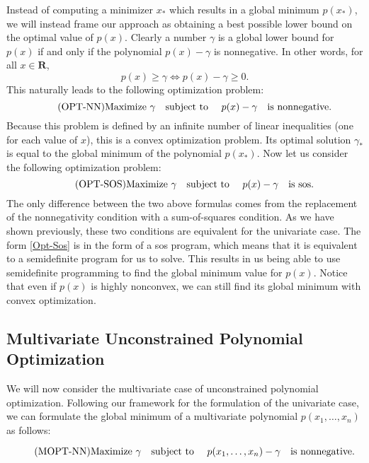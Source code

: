 	Instead of computing a minimizer $x_*$ which results in a global minimum $p(x_*)$, we will instead frame our approach as obtaining a best possible lower bound on the optimal value of $p(x)$. Clearly a number $\gamma$ is a global lower bound for $p(x)$ if and only if the polynomial $p(x) - \gamma$ is nonnegative. In other words, for all $x \in \mathbf{R}$,  
	$$
	p(x) \geq \gamma \iff p(x) - \gamma \geq 0.
	$$
	This naturally leads to the following optimization problem:
	\begin{equation} \label{Opt-Nn} \tag{OPT-NN}
		\textnormal{Maximize } \gamma \quad \textnormal{subject to } \quad p(x) - \gamma \quad \textnormal{is nonnegative}.
	\end{equation}
	Because this problem is defined by an infinite number of linear inequalities (one for each value of $x$), this is a convex optimization problem. Its optimal solution $\gamma_*$ is equal to the global minimum of the polynomial $p(x_*)$. Now let us consider the following optimization problem: 
	\begin{equation} \label{Opt-Sos} \tag{OPT-SOS}
	\textnormal{Maximize } \gamma \quad \textnormal{subject to } \quad p(x) - \gamma \quad \textnormal{is sos}.
	\end{equation}
	The only difference between the two above formulas comes from the replacement of the nonnegativity condition with a sum-of-squares condition. As we have shown previously, these two conditions are equivalent for the univariate case. The form \eqref{Opt-Sos} is in the form of a sos program, which means that it is equivalent to a semidefinite program for us to solve. This results in us being able to use semidefinite programming to find the global minimum value for $p(x)$. Notice that even if $p(x)$ is highly nonconvex, we can still find its global minimum with convex optimization. 
	
	\subsection{Multivariate Unconstrained Polynomial Optimization}
	
	We will now consider the multivariate case of unconstrained polynomial optimization. Following our framework for the formulation of the univariate case, we can formulate the global minimum of a multivariate polynomial $p(x_1, \dots, x_n)$ as follows:
	
	\begin{equation} \label{Mopt-Nn} \tag{MOPT-NN}
	\textnormal{Maximize } \gamma \quad \textnormal{subject to } \quad p(x_1, \dots, x_n) - \gamma \quad \textnormal{is nonnegative}.
	\end{equation}
	
